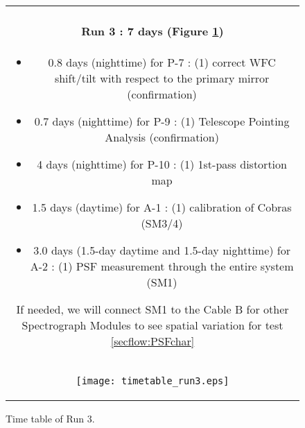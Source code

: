 \begin{figure}[!ht]
\begin{center}
\begin{tabular}{c}
\begin{minipage}{0.95\hsize}
\paragraph{Run 3 : 7 days  (Figure \ref{fig:run3})}
	\begin{itemize}
	\item 0.8 days (nighttime) for P-7 :
	(1) correct WFC shift/tilt with respect to the primary mirror (confirmation)
	\item 0.7 days (nighttime) for P-9 :
	(1) Telescope Pointing Analysis (confirmation)
	\item 4 days (nighttime) for P-10 : 
	(1) 1st-pass distortion map
	\item 1.5 days (daytime) for A-1 : 
	(1) calibration of Cobras (SM3/4)
	\item 3.0 days (1.5-day daytime and 1.5-day nighttime) for A-2 : 
	(1) PSF measurement through the entire system (SM1)
	\end{itemize}
If needed, we will connect SM1 to the Cable B for other Spectrograph Modules to see spatial variation for test \ref{secflow:PSFchar}
\end{minipage} \\
\begin{minipage}{0.8\hsize}
	\begin{center}
	\vspace*{5mm}
	\texttt{[image: timetable\_run3.eps]}
	\end{center}
	\vspace*{-5mm}
	\caption{Time table of Run 3.}
	\label{fig:run3}
\end{minipage}
\end{tabular}
\end{center}
\end{figure}

